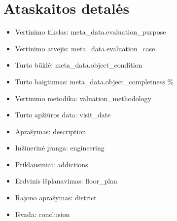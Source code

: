 \section{Ataskaitos detalės}
\begin{itemize}
    \item {Vertinimo tikslas: {{ meta_data.evaluation_purpose }}}
    \item {Vertinimo atvejis: {{ meta_data.evaluation_case }}}
    \item {Turto būklė: {{ meta_data.object_condition }}}
    \item {Turto baigtumas: {{ meta_data.object_completness }} \%}
    \item {Vertinimo metodika: {{ valuation_methodology }}}
    \item {Turto apžiūros data: {{ visit_date }}}
    \item {Aprašymas: {{ description }}}
    \item {Inžinerinė įranga: {{ engineering }}}
    \item {Priklausiniai: {{ addictions }}}
    \item {Erdvinis išplanavimas: {{ floor_plan }}}
    \item {Rajono aprašymas: {{ district }}}
    \item {Išvada: {{ conclusion }}}
\end{itemize}
